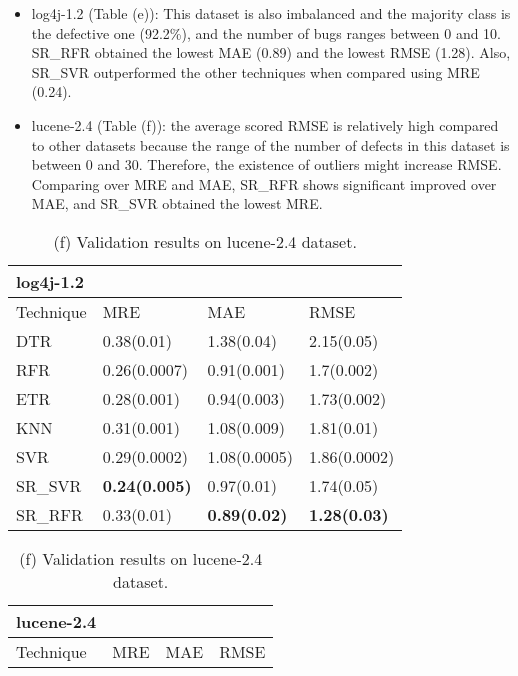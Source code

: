 \documentclass[]{article}
\begin{document}
	\begin{itemize}
		\item log4j-1.2 (Table (e)): This dataset is also imbalanced and the majority class is the defective one (92.2\%), and the number of bugs ranges between 0 and 10. SR\_RFR obtained the lowest MAE (0.89) and the lowest RMSE (1.28). Also, SR\_SVR outperformed the other techniques when compared using MRE (0.24). 
		\item lucene-2.4 (Table (f)): the average scored RMSE is relatively high compared to other datasets because the range of the number of defects in this dataset is between 0 and 30. Therefore, the existence of outliers might increase RMSE. Comparing over MRE and MAE, SR\_RFR shows significant improved over MAE, and SR\_SVR obtained the lowest MRE.
	\end{itemize}
	\begin{table}[h]
		\captionsetup[subtable]{labelformat=empty}
		\begin{adjustwidth}{-3.4cm}{}
			\begin{subtable}{9.5cm}
				\centering
				\caption{(e) Validation results on log4j-1.2 dataset.}
				\label{tab:log4j-wv}
				\begin{tabular}{llll}
					\hline
					log4j-1.2 &&&\\ \hline
					Technique & MRE & MAE & RMSE\\  \hline
					DTR & 0.38(0.01) & 1.38(0.04) & 2.15(0.05)\\ 
					RFR & 0.26(0.0007) & 0.91(0.001) & 1.7(0.002)\\ 
					ETR & 0.28(0.001) & 0.94(0.003) & 1.73(0.002)\\ 
					KNN & 0.31(0.001) & 1.08(0.009) & 1.81(0.01)\\ 
					SVR & 0.29(0.0002) & 1.08(0.0005) & 1.86(0.0002)\\ 
					SR\_SVR & \bfseries 0.24(0.005) & 0.97(0.01) & 1.74(0.05)\\
					SR\_RFR & 0.33(0.01) & \bfseries 0.89(0.02) & \bfseries 1.28(0.03)\\ \hline
				\end{tabular}
			\end{subtable}
			\begin{subtable}{9cm}
				\centering
				\caption{(f) Validation results on lucene-2.4 dataset.}
				\label{tab:lucene-wv}
				\begin{tabular}{llll}
					\hline
					lucene-2.4 &&&\\ \hline
					Technique & MRE & MAE & RMSE\\  \hline

\end{tabular}
\end{subtable}
\end{adjustwidth}
\end{table}
\end{document}
